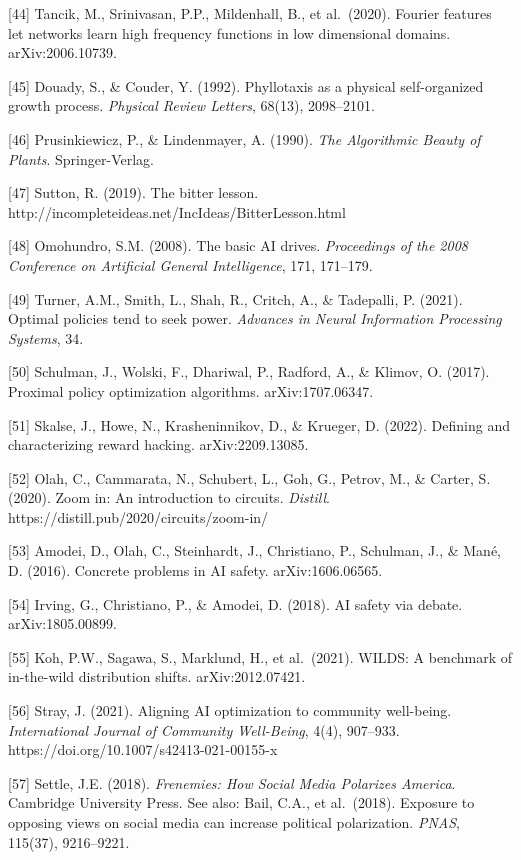 \documentclass[
  11pt,
  letterpaper,
]{article}
\begin{document}
{[}44{]} Tancik, M., Srinivasan, P.P., Mildenhall, B., et al.~(2020).
Fourier features let networks learn high frequency functions in low
dimensional domains. arXiv:2006.10739.

{[}45{]} Douady, S., \& Couder, Y. (1992). Phyllotaxis as a physical
self-organized growth process. \emph{Physical Review Letters}, 68(13),
2098--2101.

{[}46{]} Prusinkiewicz, P., \& Lindenmayer, A. (1990). \emph{The
Algorithmic Beauty of Plants}. Springer-Verlag.

{[}47{]} Sutton, R. (2019). The bitter lesson.
http://incompleteideas.net/IncIdeas/BitterLesson.html

{[}48{]} Omohundro, S.M. (2008). The basic AI drives. \emph{Proceedings
of the 2008 Conference on Artificial General Intelligence}, 171,
171--179.

{[}49{]} Turner, A.M., Smith, L., Shah, R., Critch, A., \& Tadepalli, P.
(2021). Optimal policies tend to seek power. \emph{Advances in Neural
Information Processing Systems}, 34.

{[}50{]} Schulman, J., Wolski, F., Dhariwal, P., Radford, A., \& Klimov,
O. (2017). Proximal policy optimization algorithms. arXiv:1707.06347.

{[}51{]} Skalse, J., Howe, N., Krasheninnikov, D., \& Krueger, D.
(2022). Defining and characterizing reward hacking. arXiv:2209.13085.

{[}52{]} Olah, C., Cammarata, N., Schubert, L., Goh, G., Petrov, M., \&
Carter, S. (2020). Zoom in: An introduction to circuits. \emph{Distill}.
https://distill.pub/2020/circuits/zoom-in/

{[}53{]} Amodei, D., Olah, C., Steinhardt, J., Christiano, P., Schulman,
J., \& Mané, D. (2016). Concrete problems in AI safety.
arXiv:1606.06565.

{[}54{]} Irving, G., Christiano, P., \& Amodei, D. (2018). AI safety via
debate. arXiv:1805.00899.

{[}55{]} Koh, P.W., Sagawa, S., Marklund, H., et al.~(2021). WILDS: A
benchmark of in-the-wild distribution shifts. arXiv:2012.07421.

{[}56{]} Stray, J. (2021). Aligning AI optimization to community
well-being. \emph{International Journal of Community Well-Being}, 4(4),
907--933. https://doi.org/10.1007/s42413-021-00155-x

{[}57{]} Settle, J.E. (2018). \emph{Frenemies: How Social Media
Polarizes America}. Cambridge University Press. See also: Bail, C.A., et
al.~(2018). Exposure to opposing views on social media can increase
political polarization. \emph{PNAS}, 115(37), 9216--9221.
\end{document}
